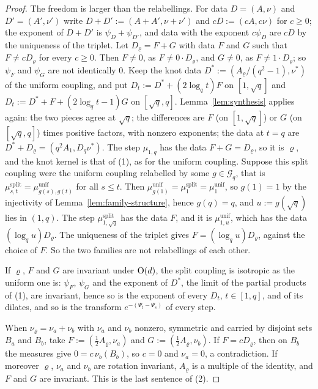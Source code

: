 \begin{proof}
The freedom is larger than the relabellings. For data $D = (A, \nu)$ and $D' = (A', \nu')$ write
$D + D' := (A + A', \nu + \nu')$ and $cD := (cA, c\nu)$ for $c \ge 0$; the exponent of $D + D'$ is
$\psi_D + \psi_{D'}$, and data with the exponent $c\psi_D$ are $cD$ by the uniqueness of the
triplet. Let $D_\varrho = F + G$ with data $F$ and $G$ such that $F \ne cD_\varrho$ for every
$c \ge 0$. Then $F \ne 0$, as $F \ne 0\cdot D_\varrho$, and $G \ne 0$, as $F \ne 1\cdot D_\varrho$; so
$\psi_F$ and $\psi_G$ are not identically $0$. Keep the knot data $D^* := (A_\varrho/(q^2 - 1),
\nu^*)$ of the uniform coupling, and put $D_t := D^* + (2\log_qt)F$ on $[1, \sqrt q]$ and
$D_t := D^* + F + (2\log_qt - 1)G$ on $[\sqrt q, q]$. Lemma~\ref{lem:synthesis} applies again: the
two pieces agree at $\sqrt q$; the differences are $F$ (on $[1, \sqrt q]$) or $G$ (on
$[\sqrt q, q]$) times positive factors, with nonzero exponents; the data at $t = q$ are
$D^* + D_\varrho = (q^2A_1, D_q\nu^*)$. The step $\mu_{1,q}$ has the data $F + G = D_\varrho$, so it is
$\varrho$, and the knot kernel is that of (1), as for the uniform coupling. Suppose this split
coupling were the uniform coupling relabelled by some $g \in \mathcal{G}_q$, that is
$\mu^{\mathrm{split}}_{s,t} = \mu^{\mathrm{unif}}_{g(s),g(t)}$ for all $s \le t$. Then
$\mu^{\mathrm{unif}}_{g(1)} = \mu^{\mathrm{split}}_1 = \mu^{\mathrm{unif}}_1$, so $g(1) = 1$ by the
injectivity of Lemma~\ref{lem:family-structure}, hence $g(q) = q$, and $u := g(\sqrt q)$ lies in
$(1, q)$. The step $\mu^{\mathrm{split}}_{1,\sqrt q}$ has the data $F$, and it is
$\mu^{\mathrm{unif}}_{1,u}$, which has the data $(\log_qu)D_\varrho$. The uniqueness of the triplet
gives $F = (\log_qu)D_\varrho$, against the choice of $F$. So the two families are not relabellings
of each other.

If $\varrho$, $F$ and $G$ are invariant under $\mathrm{O}(d)$, the split coupling is isotropic as the
uniform one is: $\psi_F$, $\psi_G$ and the exponent of $D^*$, the limit of the partial products of
(1), are invariant, hence so is the exponent of every $D_t$, $t \in [1, q]$, and of its dilates, and
so is the transform $e^{-(\Psi_t - \Psi_s)}$ of every step.

When $\nu_\varrho = \nu_a + \nu_b$ with $\nu_a$ and $\nu_b$ nonzero, symmetric and carried by
disjoint sets $B_a$ and $B_b$, take $F := (\tfrac12A_\varrho, \nu_a)$ and
$G := (\tfrac12A_\varrho, \nu_b)$. If $F = cD_\varrho$, then on $B_b$ the measures give
$0 = c\,\nu_b(B_b)$, so $c = 0$ and $\nu_a = 0$, a contradiction. If moreover $\varrho$, $\nu_a$ and
$\nu_b$ are rotation invariant, $A_\varrho$ is a multiple of the identity, and $F$ and $G$ are
invariant. This is the last sentence of (2).


\end{proof}

